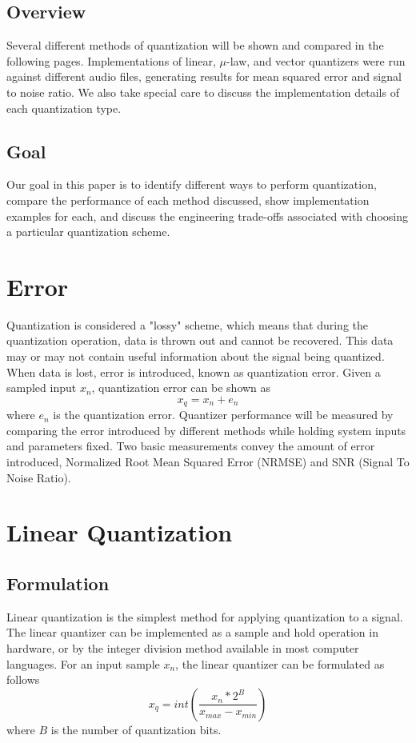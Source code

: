 \documentclass[journal]{IEEEtran}
\begin{document}
\subsection{Overview}
Several different methods of quantization will be shown and compared in the following pages. Implementations of linear, 
$\mu$-law, and vector quantizers were run against different audio files, generating results for mean squared error and 
signal to noise ratio. We also take special care to discuss the implementation details of each quantization type.

\subsection{Goal}
Our goal in this paper is to identify different ways to perform quantization, compare the performance of each method discussed, show 
implementation examples for each, and discuss the engineering trade-offs associated with choosing a particular quantization scheme.

\section{Error}
Quantization is considered a "lossy" scheme, which means that during the quantization operation, data is thrown out and cannot
be recovered. This data may or may not contain useful information about the signal being quantized. When data is lost, error is
introduced, known as quantization error. Given a sampled input $x_n$, quantization error can be shown as \cite{DSPBook}
\begin{equation}
    x_q = x_n + e_n
\end{equation}
where $e_n$ is the quantization error. Quantizer performance will be measured by comparing the error introduced by different methods
while holding system inputs and parameters fixed. Two basic measurements convey the amount of error introduced, Normalized Root Mean Squared Error (NRMSE)
and SNR (Signal To Noise Ratio).

\section{Linear Quantization}
\subsection{Formulation}
Linear quantization is the simplest method for applying quantization to a signal. The linear quantizer can be implemented as a sample
and hold operation in hardware, or by the integer division method available in most computer languages. For an input sample $x_n$, the
linear quantizer can be formulated as follows \cite{DSPBook}
\begin{equation}
    x_q = int(\frac{x_n*2^B}{x_{max} - x_{min}}) 
    \label{eq:linear}
\end{equation}
where $B$ is the number of quantization bits.
\end{document}
